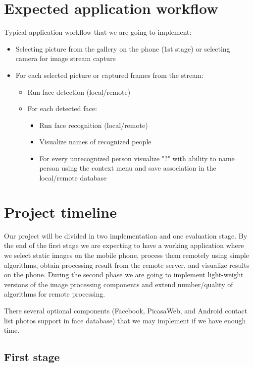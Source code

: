 \documentclass[conference]{IEEEtran}
\begin{document}
\section{Expected application workflow}

Typical application workflow that we are going to implement:

\begin{itemize}
	\item Selecting picture from the gallery on the phone (1st stage) or selecting camera for image stream capture
	\item For each selected picture or captured frames from the stream:
	\begin{itemize}
		\item Run face detection (local/remote)
		\item For each detected face:
		\begin{itemize}
			\item Run face recognition (local/remote)
			\item Visualize names of recognized people
			\item For every unrecognized person visualize "?" with ability to name person using the context menu and save association in the local/remote database
		\end{itemize}
	\end{itemize}
\end{itemize}

\section{Project timeline}

Our project will be divided in two implementation and one evaluation stage. By the end of the first stage we are expecting to have a working application where we select static images on the mobile phone, process them remotely using simple algorithms, obtain processing result from the remote server, and visualize results on the phone. During the second phase we are going to implement light-weight versions of the image processing components and extend number/quality of algorithms for remote processing.

There several optional components (Facebook, PicasaWeb, and Android contact list photos support in face database) that we may implement if we have enough time.

\subsection{First stage}
\end{document}

